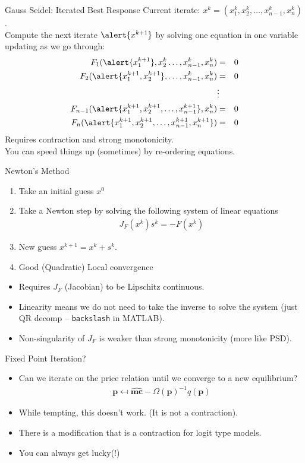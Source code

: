 \documentclass[xcolor=pdftex,dvipsnames,table,mathserif,aspectratio=169]{beamer}
\begin{document}
\begin{frame}{Gauss Seidel: Iterated Best Response}
Current iterate: $x^k = (x_1^k,x_2^k,\ldots,x_{n-1}^k,x_n^k)$.\\
\vspace{0.5cm}
Compute the next iterate $\alert{x^{k+1}}$ by solving one equation in one variable updating as we go through:\begin{eqnarray*}
F_1 (\alert{x_1^{k+1}},x_2^k \ldots, x_{n-1}^k, x_n^k)  &=& 0 \\
F_2  (\alert{x_1^{k+1},x_2^{k+1}},\ldots,x_{n-1}^k,x_n^k)  &=& 0\\
&\vdots&\\ 
F_{n-1}  (\alert{x_1^{k+1},x_2^{k+1},\ldots,x_{n-1}^{k+1}},x_n^k)  &=& 0\\
F_n  (\alert{x_1^{k+1},x_2^{k+1},\ldots,x_{n-1}^{k+1}, x_n^{k+1}})  &=& 0\\
\end{eqnarray*}
Requires contraction and strong monotonicity.\\
You can speed things up (sometimes) by re-ordering equations.
\end{frame} 

\begin{frame}{Newton's Method}
\begin{enumerate}
\item Take an initial guess $x^0$
\item Take a Newton step by solving the following system of linear equations
\begin{eqnarray*}
J_F(x^k) s^k = - F(x^k)
\end{eqnarray*}
\item New guess $x^{k+1} = x^k + s^k$.
\item Good (Quadratic) Local convergence
\end{enumerate}
\begin{itemize}
\item Requires $J_F$ (Jacobian) to be Lipschitz continuous. 
\item Linearity means we do not need to take the inverse to solve the system (just QR decomp -- \texttt{backslash} in MATLAB).
\item Non-singularity of $J_F$ is weaker than strong monotonicity (more like PSD).
\end{itemize}
\end{frame} 

\begin{frame}{Fixed Point Iteration?}
\begin{itemize}
\item Can we iterate on the price relation until we converge to a new equilibrium?
\begin{eqnarray*}
\mathbf{p} \mapsfrom \widehat{\mathbf{mc}} - \Omega(\mathbf{p})^{-1}q(\mathbf{p})
\end{eqnarray*}
\item While tempting, this doesn't work. (It is \alert{not} a contraction).
\item There is a modification that is a contraction for logit type models.
\item You can always get lucky(!)
\end{itemize}
\end{frame}
\end{document}
